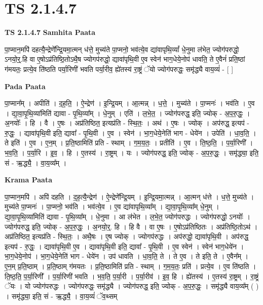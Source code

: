 \documentclass[17pt]{extarticle}
\begin{document}
\section{ TS 2.1.4.7 }

\textbf{TS 2.1.4.7 } \newline
\textbf{Samhita Paata} \newline

पा॒प्मान॒मपि॑ दहत्यै॒न्द्रेणे᳚न्द्रि॒यमा॒त्मन् ध॑त्ते॒ मुच्य॑ते पा॒प्मनो॒ भव॑त्ये॒व द्या॑वापृथि॒व्यां᳚ धे॒नुमा ल॑भेत॒ ज्योग॑परुद्धो॒ ऽनयो॒र्॒॒.हि वा  ए॒षोऽप्र॑तिष्ठि॒तोऽथै॒ष ज्योगप॑रुद्धो॒ द्यावा॑पृथि॒वी ए॒व स्वेन॑ भाग॒धेये॒नोप॑ धावति॒ ते ए॒वैनं॑ प्रति॒ष्ठां ग॑मयतः॒ प्रत्ये॒व ति॑ष्ठति पर्या॒रिणी॑ भवति पर्या॒रीव॒ ह्ये॑तस्य॑ रा॒ष्ट्रं ॅयो ज्योग॑परुद्धः॒ समृ॑द्ध्यै वाय॒व्यं॑ - [  ] \newline

\textbf{Pada Paata} \newline

पा॒प्मान᳚म् । अपीति॑ । द॒ह॒ति॒ । ऐ॒न्द्रेण॑ । इ॒न्द्रि॒यम् । आ॒त्मन्न् । ध॒त्ते॒ । मुच्य॑ते । पा॒प्मनः॑ । भव॑ति । ए॒व । द्या॒वा॒पृ॒थि॒व्या॑मिति॑ द्यावा - पृ॒थि॒व्या᳚म् । धे॒नुम् । एति॑ । ल॒भे॒त॒ । ज्योग॑परुद्ध॒ इति॒ ज्योक् - अ॒प॒रु॒द्धः॒ । अ॒नयोः᳚ । हि । वै । ए॒षः । अप्र॑तिष्ठित॒ इत्यप्र॑ति - स्थि॒तः॒ । अथ॑ । ए॒षः । ज्योक् । अप॑रुद्ध॒ इत्यप॑ - रु॒द्धः॒ । द्यावा॑पृथि॒वी इति॒ द्यावा᳚ - पृ॒थि॒वी । ए॒व । स्वेन॑ । भा॒ग॒धेये॒नेति॑ भाग - धेये॑न । उपेति॑ । धा॒व॒ति॒ । ते इति॑ । ए॒व । ए॒न॒म् । प्र॒ति॒ष्ठामिति॑ प्रति - स्थाम् । ग॒म॒य॒तः॒ । प्रतीति॑ । ए॒व । ति॒ष्ठ॒ति॒ । प॒र्या॒रिणी᳚ । भ॒व॒ति॒ । प॒र्या॒रि । इ॒व॒ । हि । ए॒तस्य॑ । रा॒ष्ट्रम् । यः । ज्योग॑परुद्ध॒ इति॒ ज्योक् - अ॒प॒रु॒द्धः॒ । समृ॑द्ध्या॒ इति॒ सं - ऋ॒द्ध्यै॒ । वा॒य॒व्य᳚म् ।  \newline


\textbf{Krama Paata} \newline

पा॒प्मान॒मपि॑ । अपि॑ दहति । द॒ह॒त्यै॒न्द्रेण॑ । ऐ॒न्द्रेणे᳚न्द्रि॒यम् । इ॒न्द्रि॒यमा॒त्मन्न् । आ॒त्मन् ध॑त्ते । ध॒त्ते॒ मुच्य॑ते । मुच्य॑ते पा॒प्मनः॑ । पा॒प्मनो॒ भव॑ति । भव॑त्ये॒व । ए॒व द्या॑वापृथि॒व्या᳚म् । द्या॒वा॒पृ॒थि॒व्या᳚म् धे॒नुम् । द्या॒वा॒पृ॒थि॒व्या॑मिति॑ द्यावा - पृ॒थि॒व्या᳚म् । धे॒नुमा । आ ल॑भेत । ल॒भे॒त॒ ज्योग॑परुद्धः । ज्योग॑परुद्धो॒ ऽनयोः᳚ । ज्योग॑परुद्ध॒ इति॒ ज्योक् - अ॒प॒रु॒द्धः॒ । अ॒नयो॒र्॒. हि । हि वै । वा ए॒षः । ए॒षोऽप्र॑तिष्ठितः । अप्र॑तिष्ठि॒तोऽथ॑ । अप्र॑तिष्ठित॒ इत्यप्र॑ति - स्थि॒तः॒ । अथै॒षः । ए॒ष ज्योक् । ज्योगप॑रुद्धः । अप॑रुद्धो॒ द्यावा॑पृथि॒वी । अप॑रुद्ध॒ इत्यप॑ - रु॒द्धः॒ । द्यावा॑पृथि॒वी ए॒व । द्यावा॑पृथि॒वी इति॒ द्यावा᳚ - पृ॒थि॒वी । ए॒व स्वेन॑ । स्वेन॑ भाग॒धेये॑न । भा॒ग॒धेये॒नोप॑ । भा॒ग॒धेये॒नेति॑ भाग - धेये॑न । उप॑ धावति । धा॒व॒ति॒ ते । ते ए॒व । ते इति॒ ते । ए॒वैन᳚म् । ए॒न॒म् प्र॒ति॒ष्ठाम् । प्र॒ति॒ष्ठाम् ग॑मयतः । प्र॒ति॒ष्ठामिति॑ प्रति - स्थाम् । ग॒म॒य॒तः॒ प्रति॑ । प्रत्ये॒व । ए॒व ति॑ष्ठति । ति॒ष्ठ॒ति॒ प॒र्या॒रिणी᳚ । प॒र्या॒रिणी॑ भवति । भ॒व॒ति॒ प॒र्या॒री । प॒र्या॒रीव॑ । इ॒व॒ हि । ह्ये॑तस्य॑ । ए॒तस्य॑ रा॒ष्ट्रम् । रा॒ष्ट्रं ॅयः । यो ज्योग॑परुद्धः । ज्योग॑परुद्धः॒ समृ॑द्ध्यै । ज्योग॑परुद्ध॒ इति॒ ज्योक् - अ॒प॒रु॒द्धः॒ । समृ॑द्ध्यै वाय॒व्य᳚म् ( ) । समृ॑द्ध्या॒ इति॒ सं - ऋ॒द्ध्यै॒ । वा॒य॒व्यं॑ ॅव॒थ्सम् \newline
\end{document}
